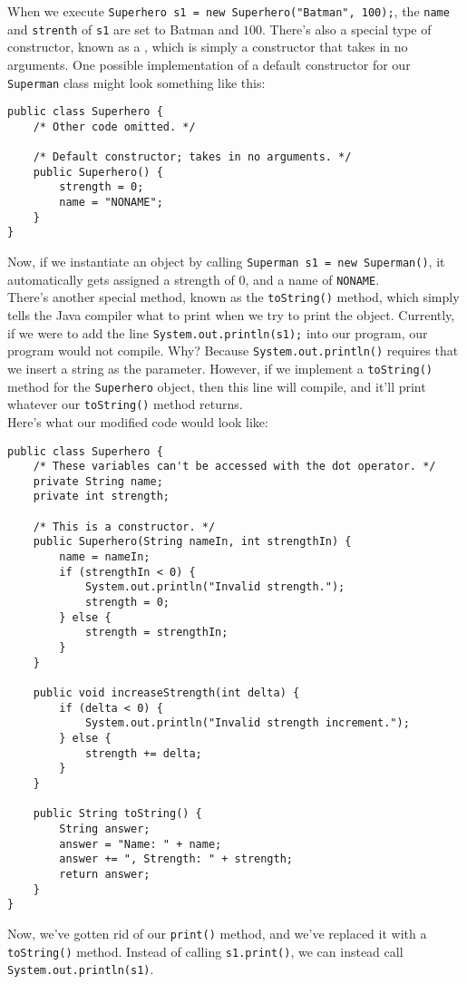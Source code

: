 When we execute \verb!Superhero s1 = new Superhero("Batman", 100);!, the \verb!name! and \verb!strenth! of \verb!s1! are set to Batman and $100$. There's also a special type of constructor, known as a , which is simply a constructor that takes in no arguments. One possible implementation of a default constructor for our \verb!Superman! class might look something like this:

\begin{lstlisting}
public class Superhero {
    /* Other code omitted. */
    
    /* Default constructor; takes in no arguments. */
    public Superhero() {
        strength = 0;
        name = "NONAME";
    }
}
\end{lstlisting}

Now, if we instantiate an object by calling \verb!Superman s1 = new Superman()!, it automatically gets assigned a strength of $0$, and a name of \verb!NONAME!. \\


There's another special method, known as the \verb!toString()! method, which simply tells the Java compiler what to print when we try to print the object. Currently, if we were to add the line \verb!System.out.println(s1);! into our program, our program would not compile. Why? Because \verb!System.out.println()! requires that we insert a string as the parameter. However, if we implement a \verb!toString()! method for the \verb!Superhero! object, then this line will compile, and it'll print whatever our \verb!toString()! method returns. \\

Here's what our modified code would look like:

\begin{lstlisting}
public class Superhero {
    /* These variables can't be accessed with the dot operator. */
    private String name;
    private int strength;
    
    /* This is a constructor. */
    public Superhero(String nameIn, int strengthIn) {
        name = nameIn;
        if (strengthIn < 0) {
            System.out.println("Invalid strength.");
            strength = 0;
        } else {
            strength = strengthIn;
        }  
    }
    
    public void increaseStrength(int delta) {
        if (delta < 0) {
            System.out.println("Invalid strength increment.");
        } else {
            strength += delta;
        }
    }
    
    public String toString() {
        String answer;
        answer = "Name: " + name;
        answer += ", Strength: " + strength;
        return answer;
    }
}
\end{lstlisting}

Now, we've gotten rid of our \verb!print()! method, and we've replaced it with a \verb!toString()! method. Instead of calling \verb!s1.print()!, we can instead call \verb!System.out.println(s1)!. 